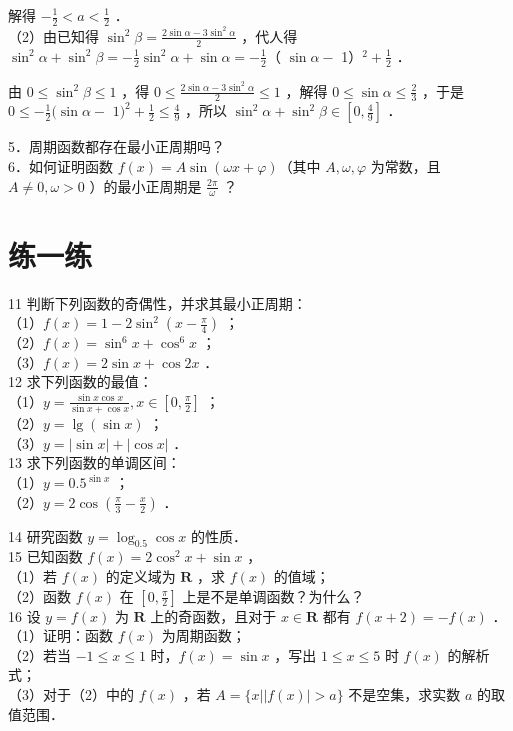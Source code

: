 \documentclass[10pt]{article}
\begin{document}
解得 \(-\frac{1}{2}<a<\frac{1}{2}\) ．\\
（2）由已知得 \(\sin ^{2} \beta=\frac{2 \sin \alpha-3 \sin ^{2} \alpha}{2}\) ，代人得 \(\sin ^{2} \alpha+\sin ^{2} \beta=-\frac{1}{2} \sin ^{2} \alpha+\sin \alpha=-\frac{1}{2}\)（ \(\sin \alpha-\) 1）\({ }^{2}+\frac{1}{2}\) ．

由 \(0 \leqslant \sin ^{2} \beta \leqslant 1\) ，得 \(0 \leqslant \frac{2 \sin \alpha-3 \sin ^{2} \alpha}{2} \leqslant 1\) ，解得 \(0 \leqslant \sin \alpha \leqslant \frac{2}{3}\) ，于是 \(0 \leqslant-\frac{1}{2}(\sin \alpha-\) \(1)^{2}+\frac{1}{2} \leqslant \frac{4}{9}\) ，所以 \(\sin ^{2} \alpha+\sin ^{2} \beta \in\left[0, \frac{4}{9}\right]\) ．

5．周期函数都存在最小正周期吗？\\
6．如何证明函数 \(f(x)=A \sin (\omega x+\varphi)\)（其中 \(A, \omega, \varphi\) 为常数，且 \(A \neq 0, \omega>0\) ）的最小正周期是 \(\frac{2 \pi}{\omega}\) ？

\section*{练一练}
11 判断下列函数的奇偶性，并求其最小正周期：\\
（1）\(f(x)=1-2 \sin ^{2}\left(x-\frac{\pi}{4}\right)\) ；\\
（2）\(f(x)=\sin ^{6} x+\cos ^{6} x\) ；\\
（3）\(f(x)=2 \sin x+\cos 2 x\) ．\\
12 求下列函数的最值：\\
（1）\(y=\frac{\sin x \cos x}{\sin x+\cos x}, x \in\left[0, \frac{\pi}{2}\right]\) ；\\
（2）\(y=\lg (\sin x)\) ；\\
（3）\(y=|\sin x|+|\cos x|\) ．\\
13 求下列函数的单调区间：\\
（1）\(y=0.5^{\sin x}\) ；\\
（2）\(y=2 \cos \left(\frac{\pi}{3}-\frac{x}{2}\right)\) ．

14 研究函数 \(y=\log _{0.5} \cos x\) 的性质．\\
15 已知函数 \(f(x)=2 \cos ^{2} x+\sin x\) ，\\
（1）若 \(f(x)\) 的定义域为 \(\mathbf{R}\) ，求 \(f(x)\) 的值域；\\
（2）函数 \(f(x)\) 在 \(\left[0, \frac{\pi}{2}\right]\) 上是不是单调函数？为什么？\\
16 设 \(y=f(x)\) 为 \(\mathbf{R}\) 上的奇函数，且对于 \(x \in \mathbf{R}\) 都有 \(f(x+2)=-f(x)\) ．\\
（1）证明：函数 \(f(x)\) 为周期函数；\\
（2）若当 \(-1 \leqslant x \leqslant 1\) 时，\(f(x)=\sin x\) ，写出 \(1 \leqslant x \leqslant 5\) 时 \(f(x)\) 的解析式；\\
（3）对于（2）中的 \(f(x)\) ，若 \(A=\{x| | f(x) \mid>a\}\) 不是空集，求实数 \(a\) 的取值范围．
\end{document}
